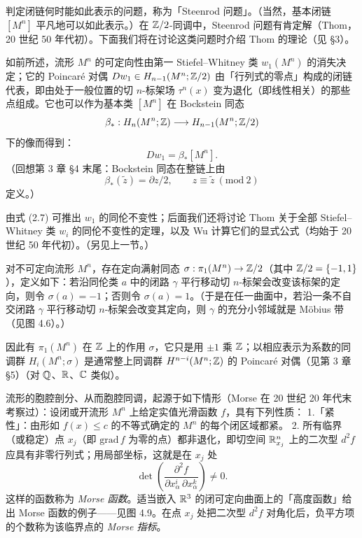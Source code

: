 判定闭链何时能如此表示的问题，称为「Steenrod 问题」。（当然，基本闭链 $[M^n]$ 平凡地可以如此表示。）在 $\mathbb{Z}/2$-同调中，Steenrod 问题有肯定解（Thom，20 世纪 50 年代初）。下面我们将在讨论这类问题时介绍 Thom 的理论（见 §3）。

如前所述，流形 $M^n$ 的可定向性由第一 Stiefel--Whitney 类 $w_1(M^n)$ 的消失决定；它的 Poincaré 对偶 $Dw_1\in H_{n-1}(M^n;\mathbb{Z}/2)$ 由「行列式的零点」构成的闭链代表，即由处于一般位置的切 $n$-标架场 $\tau^n(x)$ 变为退化（即线性相关）的那些点组成。它也可以作为基本类 $[M^n]$ 在 Bockstein 同态
\[
  \beta_*:H_n(M^n;\mathbb{Z})\longrightarrow H_{n-1}(M^n;\mathbb{Z}/2)
\]
下的像而得到：
\begin{equation}
  Dw_1=\beta_*[M^n]. \tag{2.7}
\end{equation}
（回想第 3 章 §4 末尾：Bockstein 同态在整链上由
\[
  \beta_*(\tilde z)=\partial z/2,\qquad z\equiv\tilde z\ (\mathrm{mod}\ 2)
\]
定义。）

由式 (2.7) 可推出 $w_1$ 的同伦不变性；后面我们还将讨论 Thom 关于全部 Stiefel--Whitney 类 $w_i$ 的同伦不变性的定理，以及 Wu 计算它们的显式公式（均始于 20 世纪 50 年代初）。（另见上一节。）

对不可定向流形 $M^n$，存在定向满射同态 $\sigma:\pi_1(M^n)\to\mathbb{Z}/2$（其中 $\mathbb{Z}/2=\{-1,1\}$），定义如下：若沿同伦类 $a$ 中的闭路 $\gamma$ 平行移动切 $n$-标架会改变该标架的定向，则令 $\sigma(a)=-1$；否则令 $\sigma(a)=1$。（于是在任一曲面中，若沿一条不自交闭路 $\gamma$ 平行移动切 $n$-标架会改变其定向，则 $\gamma$ 的充分小邻域就是 Möbius 带（见图 4.6）。）

因此有 $\pi_1(M^n)$ 在 $\mathbb{Z}$ 上的作用 $\sigma$，它只是用 $\pm 1$ 乘 $\mathbb{Z}$；以相应表示为系数的同调群 $H_i(M^n;\sigma)$ 是通常整上同调群 $H^{n-i}(M^n;\mathbb{Z})$ 的 Poincaré 对偶（见第 3 章 §5）（对 $\mathbb{Q}$、$\mathbb{R}$、$\mathbb{C}$ 类似）。

流形的胞腔剖分、从而胞腔同调，起源于如下情形（Morse 在 20 世纪 20 年代末考察过）：设闭或开流形 $M^n$ 上给定实值光滑函数 $f$，具有下列性质：
1.「紧性」：由形如 $f(x)\le c$ 的不等式确定的 $M^n$ 的每个闭区域都紧。
2. 所有临界（或稳定）点 $x_j$（即 $\mathrm{grad}\,f$ 为零的点）都非退化，即切空间 $\mathbb{R}^n_{x_j}$ 上的二次型 $d^2f$ 应具有非零行列式；用局部坐标，这就是在 $x_j$ 处
\[
  \det\left(\frac{\partial^2f}{\partial x_\alpha^i\,\partial x_\alpha^k}\right)\ne 0.
\]
这样的函数称为 \emph{Morse 函数}。适当嵌入 $\mathbb{R}^3$ 的闭可定向曲面上的「高度函数」给出 Morse 函数的例子——见图 4.9。在点 $x_j$ 处把二次型 $d^2f$ 对角化后，负平方项的个数称为该临界点的 \emph{Morse 指标}。

